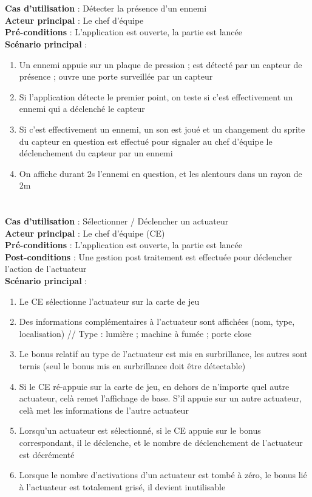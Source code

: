 \paragraph{}
~\\
\textbf{Cas d’utilisation} :  Détecter la présence d’un ennemi\\
\textbf{Acteur principal} : Le chef d’équipe\\
\textbf{Pré-conditions} : L’application est ouverte, la partie est lancée\\
\textbf{Scénario principal} :
\begin{enumerate}
 \item Un ennemi {appuie sur un plaque de pression ; est détecté par un capteur de présence ; ouvre une porte surveillée par un capteur}
 \item Si l’application détecte le premier point, on teste si c’est effectivement un ennemi qui a déclenché le capteur
 \item Si c’est effectivement un ennemi, un son est joué et un changement du sprite du capteur en question est effectué pour signaler au chef d’équipe le déclenchement du capteur par un ennemi
 \item On affiche durant 2s l’ennemi en question, et les alentours dans un rayon de 2m
\end{enumerate}

\paragraph{}
~\\
\textbf{Cas d’utilisation} :  Sélectionner / Déclencher un actuateur\\
\textbf{Acteur principal} : Le chef d’équipe (CE)\\
\textbf{Pré-conditions} : L’application est ouverte, la partie est lancée\\
\textbf{Post-conditions} :  Une gestion post traitement est effectuée pour déclencher l’action de l’actuateur\\
\textbf{Scénario principal} :
\begin{enumerate}
 \item Le CE sélectionne l’actuateur sur la carte de jeu
 \item Des informations complémentaires à l’actuateur sont affichées (nom, type, localisation) // Type : {lumière ; machine à fumée ; porte close}
 \item Le bonus relatif au type de l’actuateur est mis en surbrillance, les autres sont ternis (seul le bonus mis en surbrillance doit être détectable)
 \item Si le CE ré-appuie sur la carte de jeu, en dehors de n’importe quel autre actuateur, celà remet l’affichage de base. S’il appuie sur un autre actuateur, celà met les informations de l’autre actuateur
 \item Lorsqu’un actuateur est sélectionné, si le CE appuie sur le bonus correspondant, il le déclenche, et le nombre de déclenchement de l’actuateur est décrémenté
 \item Lorsque le nombre d’activations d’un actuateur est tombé à zéro, le bonus lié à l’actuateur est totalement grisé, il devient inutilisable
\end{enumerate}

